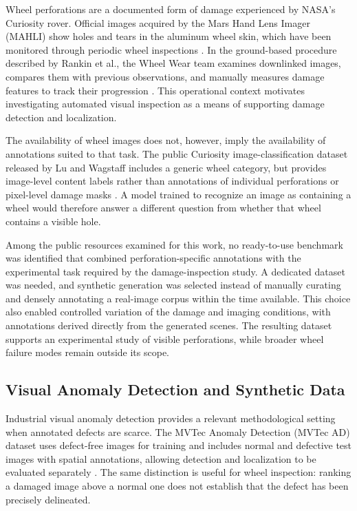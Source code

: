 Wheel perforations are a documented form of damage experienced by NASA's Curiosity rover. Official images acquired by the Mars Hand Lens Imager (MAHLI) show holes and tears in the aluminum wheel skin, which have been monitored through periodic wheel inspections \cite{nasa2016wheelinspection}. In the ground-based procedure described by Rankin et al., the Wheel Wear team examines downlinked images, compares them with previous observations, and manually measures damage features to track their progression \cite{rankin2022wheelassessment}. This operational context motivates investigating automated visual inspection as a means of supporting damage detection and localization.

The availability of wheel images does not, however, imply the availability of annotations suited to that task. The public Curiosity image-classification dataset released by Lu and Wagstaff includes a generic wheel category, but provides image-level content labels rather than annotations of individual perforations or pixel-level damage masks \cite{lu2020mslimages}. A model trained to recognize an image as containing a wheel would therefore answer a different question from whether that wheel contains a visible hole.

Among the public resources examined for this work, no ready-to-use benchmark was identified that combined perforation-specific annotations with the experimental task required by the damage-inspection study. A dedicated dataset was needed, and synthetic generation was selected instead of manually curating and densely annotating a real-image corpus within the time available. This choice also enabled controlled variation of the damage and imaging conditions, with annotations derived directly from the generated scenes. The resulting dataset supports an experimental study of visible perforations, while broader wheel failure modes remain outside its scope.

\subsection{Visual Anomaly Detection and Synthetic Data}

Industrial visual anomaly detection provides a relevant methodological setting when annotated defects are scarce. The MVTec Anomaly Detection (MVTec AD) dataset uses defect-free images for training and includes normal and defective test images with spatial annotations, allowing detection and localization to be evaluated separately \cite{bergmann2019mvtec}. The same distinction is useful for wheel inspection: ranking a damaged image above a normal one does not establish that the defect has been precisely delineated.

